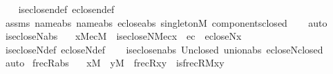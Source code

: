 \begin{isabellebody}
%
\isadelimproof
\ \ %
\endisadelimproof
%
\isatagproof
{}\isamarkupfalse%
\ is{\isacharunderscore}{\kern0pt}eclose{\isacharunderscore}{\kern0pt}n{\isacharunderscore}{\kern0pt}def\ eclose{\isacharunderscore}{\kern0pt}n{\isacharunderscore}{\kern0pt}def\isanewline
\ \ \isamarkupfalse%
\ assms\ name{}{\isacharunderscore}{\kern0pt}abs\ name{}{\isacharunderscore}{\kern0pt}abs\ eclose{\isacharunderscore}{\kern0pt}abs\ singletonM\ components{\isacharunderscore}{\kern0pt}closed\isanewline
\ \ \isamarkupfalse%
\ auto%
\endisatagproof
{\isafoldproof}%
%
\isadelimproof
\isanewline
%
\endisadelimproof
\isanewline
\isanewline
{}\isamarkupfalse%
\ is{\isacharunderscore}{\kern0pt}ecloseN{\isacharunderscore}{\kern0pt}abs\ {\isacharcolon}{\kern0pt}\isanewline
\ \ {\isachardoublequoteopen}{\isasymlbrakk}x{\isasymin}M{\isacharsemicolon}{\kern0pt}ec{\isasymin}M{\isasymrbrakk}\ {\isasymLongrightarrow}\ is{\isacharunderscore}{\kern0pt}ecloseN{\isacharparenleft}{\kern0pt}{\isacharhash}{\kern0pt}{\isacharhash}{\kern0pt}M{\isacharcomma}{\kern0pt}ec{\isacharcomma}{\kern0pt}x{\isacharparenright}{\kern0pt}\ {\isasymlongleftrightarrow}\ ec\ {\isacharequal}{\kern0pt}\ ecloseN{\isacharparenleft}{\kern0pt}x{\isacharparenright}{\kern0pt}{\isachardoublequoteclose}\isanewline
%
\isadelimproof
\ \ %
\endisadelimproof
%
\isatagproof
{}\isamarkupfalse%
\ is{\isacharunderscore}{\kern0pt}ecloseN{\isacharunderscore}{\kern0pt}def\ ecloseN{\isacharunderscore}{\kern0pt}def\isanewline
\ \ \isamarkupfalse%
\ is{\isacharunderscore}{\kern0pt}eclose{\isacharunderscore}{\kern0pt}n{\isacharunderscore}{\kern0pt}abs\ Un{\isacharunderscore}{\kern0pt}closed\ union{\isacharunderscore}{\kern0pt}abs\ ecloseN{\isacharunderscore}{\kern0pt}closed\isanewline
\ \ \isamarkupfalse%
\ auto%
\endisatagproof
{\isafoldproof}%
%
\isadelimproof
\isanewline
%
\endisadelimproof
\isanewline
{}\isamarkupfalse%
\ frecR{\isacharunderscore}{\kern0pt}abs\ {\isacharcolon}{\kern0pt}\isanewline
\ \ {\isachardoublequoteopen}x{\isasymin}M\ {\isasymLongrightarrow}\ y{\isasymin}M\ {\isasymLongrightarrow}\ frecR{\isacharparenleft}{\kern0pt}x{\isacharcomma}{\kern0pt}y{\isacharparenright}{\kern0pt}\ {\isasymlongleftrightarrow}\ is{\isacharunderscore}{\kern0pt}frecR{\isacharparenleft}{\kern0pt}{\isacharhash}{\kern0pt}{\isacharhash}{\kern0pt}M{\isacharcomma}{\kern0pt}x{\isacharcomma}{\kern0pt}y{\isacharparenright}{\kern0pt}{\isachardoublequoteclose}\isanewline
%
\isadelimproof
\ \ %
\endisadelimproof

\end{isabellebody}
